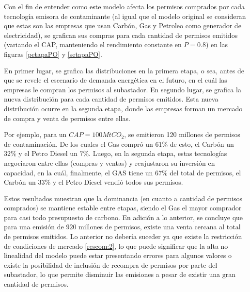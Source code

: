 Con el fin de entender como este modelo afecta los permisos comprados por cada tecnología emisora de contaminante (al igual que el modelo original se consideran que estas son las empresas que usan Carbón, Gas y Petroleo como generador de electricidad), se grafican sus compras para cada cantidad de permisos emitidos (variando el CAP, manteniendo el rendimiento constante en $P=0.8$) en las figuras \ref{petapaPO} y \ref{setapaPO}.
\vspace{2.5mm}

En primer lugar, se grafica las distribuciones en la primera etapa, o sea, antes de que se revele el escenario de demanda energética en el futuro, en el cuál las empresas le compran los permisos al subastador. En segundo lugar, se grafica la nueva distribución para cada cantidad de permisos emitidos. Esta nueva distribución ocurre en la segunda etapa, donde las empresas forman un mercado de compra y venta de permisos entre ellas.
\vspace{2.5mm}

Por ejemplo, para un $CAP=100MtCO_2$, se emitieron 120 millones de permisos de contaminación. De los cuales el Gas compró un $61\%$ de esto, el Carbón un $32\%$ y el Petro Diesel un $7\%$. Luego, en la segunda etapa, estas tecnologías negociaron entre ellas (compras y ventas) y reajustaron su inversión en capacidad, en la cuál, finalmente, el GAS tiene un $67\%$ del total de permisos, el Carbón un $33\%$ y el Petro Diesel vendió todos sus permisos. 
\vspace{2.5mm}

Estos resultados muestran que la dominancia (en cuanto a cantidad de permisos comprados) se mantiene estable entre etapas, siendo el Gas el mayor comprador para casi todo presupuesto de carbono. En adición a lo anterior, se concluye que para una emisión de $920$ millones de permisos, existe una venta cercana al total de permisos emitidos. Lo anterior no debería suceder ya que existe la restricción de condiciones de mercado \ref{rescom:2}, lo que puede significar que la alta no linealidad del modelo puede estar presentando errores para algunos valores o existe la posibilidad de inclusión de recompra de permisos por parte del subastador, lo que permite disminuir las emisiones a pesar de existir una gran cantidad de permisos.
\vspace{2.5mm}

